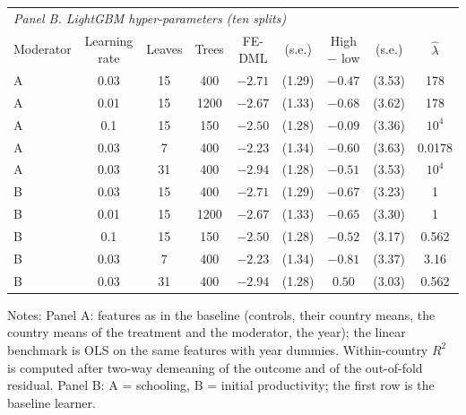 \documentclass[pdflatex,sn-basic]{sn-jnl}%
\theoremstyle{thmstyleone}
\theoremstyle{thmstyletwo}
\renewenvironment{table}[1][]{\begin{tableorg}[#1]\centering\tablebodyfont}{\end{tableorg}}
\begin{document}
\begin{appendices}
\begin{table}[!ht]
{\begin{threeparttable}
\medskip
\begin{tabular}{lcccccccc}
\toprule
\multicolumn{9}{l}{\textit{Panel B. LightGBM hyper-parameters (ten splits)}}\\
Moderator & Learning rate & Leaves & Trees & FE-DML & (s.e.) & High $-$ low & (s.e.) & $\hat\lambda$\\
\midrule
A & 0.03 & 15 & 400 & $-2.71$ & (1.29) & $-0.47$ & (3.53) & 178\\
A & 0.01 & 15 & 1200 & $-2.67$ & (1.33) & $-0.68$ & (3.62) & 178\\
A & 0.1 & 15 & 150 & $-2.50$ & (1.28) & $-0.09$ & (3.36) & $10^{4}$\\
A & 0.03 & 7 & 400 & $-2.23$ & (1.34) & $-0.60$ & (3.63) & 0.0178\\
A & 0.03 & 31 & 400 & $-2.94$ & (1.28) & $-0.51$ & (3.53) & $10^{4}$\\
B & 0.03 & 15 & 400 & $-2.71$ & (1.29) & $-0.67$ & (3.23) & 1\\
B & 0.01 & 15 & 1200 & $-2.67$ & (1.33) & $-0.65$ & (3.30) & 1\\
B & 0.1 & 15 & 150 & $-2.50$ & (1.28) & $-0.52$ & (3.17) & 0.562\\
B & 0.03 & 7 & 400 & $-2.23$ & (1.34) & $-0.81$ & (3.37) & 3.16\\
B & 0.03 & 31 & 400 & $-2.94$ & (1.28) & $0.50$ & (3.03) & 0.562\\
\bottomrule
\end{tabular}
\begin{tablenotes}\scriptsize
\item Notes: Panel A: features as in the baseline (controls, their country means, the country means of the treatment and the moderator, the year); the linear benchmark is OLS on the same features with year dummies. Within-country $R^2$ is computed after two-way demeaning of the outcome and of the out-of-fold residual. Panel B: A = schooling, B = initial productivity; the first row is the baseline learner.
\end{tablenotes}
\end{threeparttable}}
\end{table}


\end{appendices}
\end{document}
